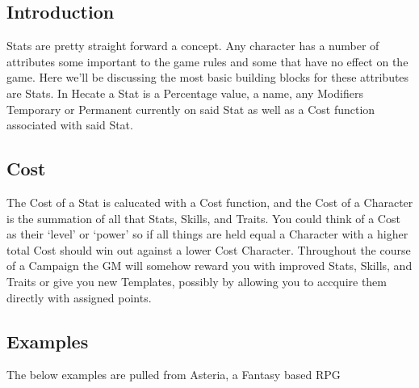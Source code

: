 
\subsection{Introduction}
\Glspl{Stat} are pretty straight forward a concept.  Any character
has a number of attributes some important to the game rules and
some that have no effect on the game.  Here we'll be discussing
the most basic building blocks for these attributes are Stats.
In Hecate a \gls{Stat} is a Percentage value, a name, any
\glspl{Modifier} Temporary or Permanent currently on said \gls{Stat}
as well as a \gls{Cost} function associated with said \gls{Stat}.

\subsection{Cost}
The \gls{Cost} of a \gls{Stat} is calucated with a \gls{Cost}
function, and the \gls{Cost} of a \gls{Character} is the summation
of all that  \glspl{Stat},
\glspl{Skill}, and \glspl{Trait}.  You could think of a
 \gls{Cost} as their `level' or `power'
so if all things are held equal a \gls{Character} with a higher
total \gls{Cost} should win out against a lower \gls{Cost}
\gls{Character}.  Throughout the course of a \gls{Campaign} the
\gls{GM} will somehow reward you with improved \glspl{Stat}, \glspl{Skill},
and \glspl{Trait} or give you new \glspl{Template}, possibly by
allowing you to accquire them directly with assigned points.

\subsection{Examples}
The below examples are pulled from Asteria, a Fantasy based \gls{RPG}

